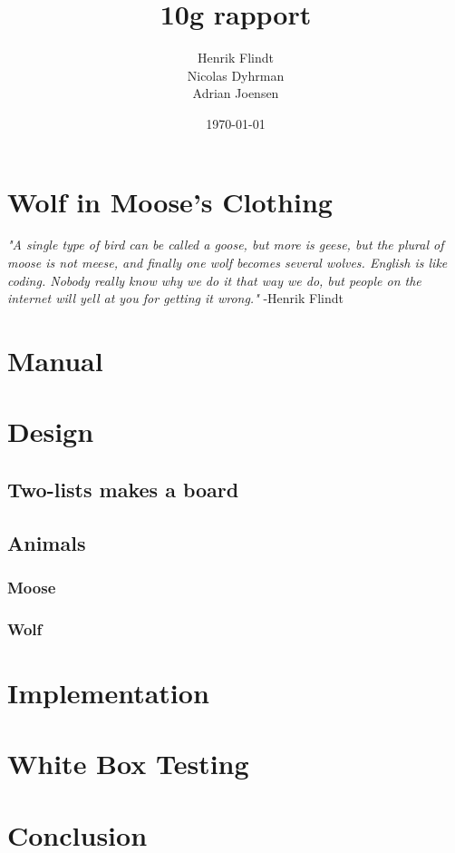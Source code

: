 \documentclass{article}
\title{10g rapport}
\author{Henrik Flindt\\Nicolas Dyhrman\\Adrian Joensen}
\date{\today}
\begin{document}
    \maketitle
    
    \section*{Wolf in Moose's Clothing}
    \textit{"A single type of bird can be called a goose, but more is geese, but the plural of moose is not meese, and finally one wolf becomes several wolves. English is like coding. Nobody really know why we do it that way we do, but people on the internet will yell at you for getting it wrong."} -Henrik Flindt
    \section{Manual}
   
    
    \section{Design}
    \subsection{Two-lists makes a board}
    \subsection{Animals}
    \subsubsection{Moose}
    \subsubsection{Wolf}    

    \section{Implementation}
       
         
    \section{White Box Testing}
   	   
    \section{Conclusion}
     
\end{document}
